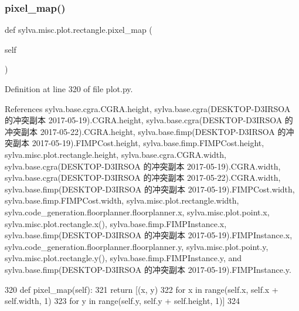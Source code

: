 \subsubsection{\texorpdfstring{pixel\+\_\+map()}{pixel\_map()}}
{\footnotesize\ttfamily def sylva.\+misc.\+plot.\+rectangle.\+pixel\+\_\+map (\begin{DoxyParamCaption}\item[{}]{self }\end{DoxyParamCaption})}



Definition at line 320 of file plot.\+py.



References sylva.\+base.\+cgra.\+C\+G\+R\+A.\+height, sylva.\+base.\+cgra(\+D\+E\+S\+K\+T\+O\+P-\/\+D3\+I\+R\+S\+O\+A 的冲突副本 2017-\/05-\/19).\+C\+G\+R\+A.\+height, sylva.\+base.\+cgra(\+D\+E\+S\+K\+T\+O\+P-\/\+D3\+I\+R\+S\+O\+A 的冲突副本 2017-\/05-\/22).\+C\+G\+R\+A.\+height, sylva.\+base.\+fimp(\+D\+E\+S\+K\+T\+O\+P-\/\+D3\+I\+R\+S\+O\+A 的冲突副本 2017-\/05-\/19).\+F\+I\+M\+P\+Cost.\+height, sylva.\+base.\+fimp.\+F\+I\+M\+P\+Cost.\+height, sylva.\+misc.\+plot.\+rectangle.\+height, sylva.\+base.\+cgra.\+C\+G\+R\+A.\+width, sylva.\+base.\+cgra(\+D\+E\+S\+K\+T\+O\+P-\/\+D3\+I\+R\+S\+O\+A 的冲突副本 2017-\/05-\/19).\+C\+G\+R\+A.\+width, sylva.\+base.\+cgra(\+D\+E\+S\+K\+T\+O\+P-\/\+D3\+I\+R\+S\+O\+A 的冲突副本 2017-\/05-\/22).\+C\+G\+R\+A.\+width, sylva.\+base.\+fimp(\+D\+E\+S\+K\+T\+O\+P-\/\+D3\+I\+R\+S\+O\+A 的冲突副本 2017-\/05-\/19).\+F\+I\+M\+P\+Cost.\+width, sylva.\+base.\+fimp.\+F\+I\+M\+P\+Cost.\+width, sylva.\+misc.\+plot.\+rectangle.\+width, sylva.\+code\+\_\+generation.\+floorplanner.\+floorplanner.\+x, sylva.\+misc.\+plot.\+point.\+x, sylva.\+misc.\+plot.\+rectangle.\+x(), sylva.\+base.\+fimp.\+F\+I\+M\+P\+Instance.\+x, sylva.\+base.\+fimp(\+D\+E\+S\+K\+T\+O\+P-\/\+D3\+I\+R\+S\+O\+A 的冲突副本 2017-\/05-\/19).\+F\+I\+M\+P\+Instance.\+x, sylva.\+code\+\_\+generation.\+floorplanner.\+floorplanner.\+y, sylva.\+misc.\+plot.\+point.\+y, sylva.\+misc.\+plot.\+rectangle.\+y(), sylva.\+base.\+fimp.\+F\+I\+M\+P\+Instance.\+y, and sylva.\+base.\+fimp(\+D\+E\+S\+K\+T\+O\+P-\/\+D3\+I\+R\+S\+O\+A 的冲突副本 2017-\/05-\/19).\+F\+I\+M\+P\+Instance.\+y.


\begin{DoxyCode}
320         \textcolor{keyword}{def }pixel\_map(self):
321             \textcolor{keywordflow}{return} [(x, y)
322                     \textcolor{keywordflow}{for} x \textcolor{keywordflow}{in} range(self.x, self.x + self.width, 1)
323                     \textcolor{keywordflow}{for} y \textcolor{keywordflow}{in} range(self.y, self.y + self.height, 1)]
324 
\end{DoxyCode}
\mbox{\label{classsylva_1_1misc_1_1plot_1_1rectangle_ab0cdba67562bf45f97399b1e4529d6ac}} 
